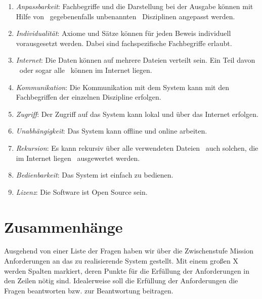 \documentclass[english,ngerman,parskip=half,headsepline,footsepline]{scrreprt}
\begin{document}
\begin{enumerate}
		\item \label{Ziel:Anpassbarkeit} \emph{Anpassbarkeit}: Fachbegriffe und die Darstellung bei der Ausgabe können mit Hilfe von \textendash\ gegebenenfalls unbenannten \textendash\ Disziplinen angepasst werden.
		
		\item \label{Ziel:Individualität} \emph{Individualität}: Axiome und Sätze können für jeden Beweis individuell vorausgesetzt werden. Dabei sind fachspezifische Fachbegriffe erlaubt.
		
		\item \label{Ziel:Internet} \emph{Internet}: Die Daten können auf mehrere Dateien verteilt sein. Ein Teil davon \textendash\ oder sogar alle \textendash\ können im Internet liegen.
		
		\item \label{Ziel:Kommunikation} \emph{Kommunikation}: Die Kommunikation mit dem System kann mit den Fachbegriffen der einzelnen Diszipline erfolgen.
		
		\item \label{Ziel:Zugriff} \emph{Zugriff}: Der Zugriff auf das System kann lokal und über das Internet erfolgen.
		
		\item \label{Ziel:Unabhängigkeit} \emph{Unabhängigkeit}: Das System kann offline und online arbeiten.
		
		\item \label{Ziel:Rekursion} \emph{Rekursion}: Es kann rekursiv über alle verwendeten Dateien \textendash\ auch solchen, die im Internet liegen \textendash\ ausgewertet werden.
		
		\item \label{Ziel:Bedienbarkeit} \emph{Bedienbarkeit}: Das System ist einfach zu bedienen.
		
		\item \label{Ziel:Lizenz} \emph{Lizenz}: Die Software ist Open Source sein.
	\end{enumerate}
	
	\section{Zusammenhänge}
	\label{sec:Zusammenhänge}
	Ausgehend von einer Liste der Fragen haben wir über die Zwischenstufe Mission Anforderungen an das zu realisierende System gestellt. Mit einem großen X werden Spalten markiert, deren Punkte für die Erfüllung der Anforderungen in den Zeilen nötig sind. Idealerweise soll die Erfüllung der Anforderungen die Fragen beantworten bzw. zur Beantwortung beitragen.
	
\end{document}

